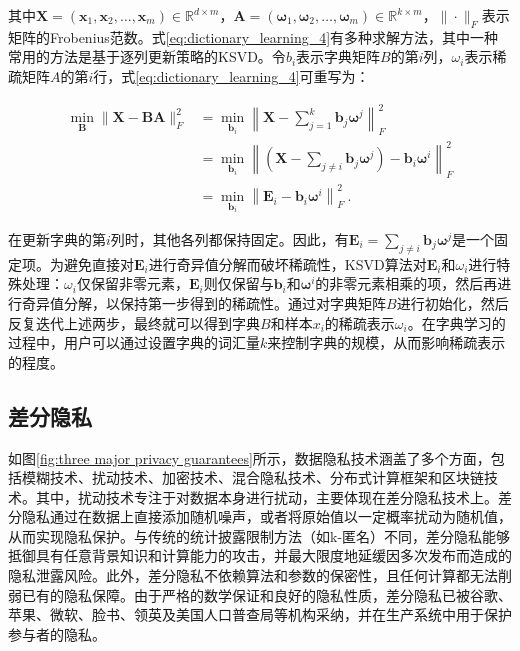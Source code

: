 其中$\mathbf{X} = (\boldsymbol{x}_1, \boldsymbol{x}_2, \ldots, \boldsymbol{x}_m) \in \mathbb{R}^{d \times m}$，$\mathbf{A} = (\boldsymbol{\omega}_1, \boldsymbol{\omega}_2, \ldots, \boldsymbol{\omega}_m) \in \mathbb{R}^{k \times m}$，$\|\cdot\|_F$表示矩阵的Frobenius范数。式\ref{eq:dictionary_learning_4}有多种求解方法，其中一种常用的方法是基于逐列更新策略的KSVD。令$b_i$表示字典矩阵$B$的第$i$列，$\omega_i$表示稀疏矩阵$A$的第$i$行，式\ref{eq:dictionary_learning_4}可重写为：

\begin{equation}\begin{aligned}
\operatorname*{min}_{\mathbf{B}}\|\mathbf{X}-\mathbf{BA}\|_{F}^{2}& =\min_{\boldsymbol{b}_{i}}\left\|\mathbf{X}-\sum_{j=1}^{k}\boldsymbol{b}_{j}\boldsymbol{\omega}^{j}\right\|_{F}^{2}  \\
&=\min_{\boldsymbol{b}_i}\left\|\left(\mathbf{X}-\sum_{j\neq i}\boldsymbol{b}_j\boldsymbol{\omega}^j\right)-\boldsymbol{b}_i\boldsymbol{\omega}^i\right\|_F^2 \\
&=\min_{\boldsymbol{b}_{i}}\left\|\mathbf{E}_{i}-\boldsymbol{b}_{i}\boldsymbol{\omega}^{i}\right\|_{F}^{2}\:.
\end{aligned}
\label{eq:dictionay_learning 4}
\end{equation}

在更新字典的第$i$列时，其他各列都保持固定。因此，有$\mathbf{E}_i=\sum_{j\neq i}\boldsymbol{b}_j\boldsymbol{\omega}^j$是一个固定项。为避免直接对$\mathbf{E}_i$进行奇异值分解而破坏稀疏性，KSVD算法对$\mathbf{E}_i$和$\omega_i$进行特殊处理：$\omega_i$仅保留非零元素，$\mathbf{E}_i$则仅保留与$\boldsymbol{b}_i$和$\boldsymbol{\omega}^i$的非零元素相乘的项，然后再进行奇异值分解，以保持第一步得到的稀疏性。通过对字典矩阵$B$进行初始化，然后反复迭代上述两步，最终就可以得到字典$B$和样本$x_i$的稀疏表示$\omega_i$。在字典学习的过程中，用户可以通过设置字典的词汇量$k$来控制字典的规模，从而影响稀疏表示的程度。


\subsection{差分隐私}

如图\ref{fig:three major privacy guarantees}所示，数据隐私技术涵盖了多个方面，包括模糊技术、扰动技术、加密技术、混合隐私技术、分布式计算框架和区块链技术。其中，扰动技术专注于对数据本身进行扰动，主要体现在差分隐私技术上。差分隐私通过在数据上直接添加随机噪声，或者将原始值以一定概率扰动为随机值，从而实现隐私保护。与传统的统计披露限制方法（如k-匿名）不同，差分隐私能够抵御具有任意背景知识和计算能力的攻击，并最大限度地延缓因多次发布而造成的隐私泄露风险。此外，差分隐私不依赖算法和参数的保密性，且任何计算都无法削弱已有的隐私保障。由于严格的数学保证和良好的隐私性质，差分隐私已被谷歌、苹果、微软、脸书、领英及美国人口普查局等机构采纳，并在生产系统中用于保护参与者的隐私。

